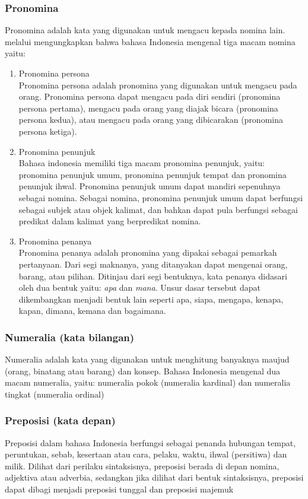 \subsubsection{Pronomina}
Pronomina adalah kata yang digunakan untuk mengacu kepada nomina lain. \citet{alwi} melalui \citet{suryawan} mengungkapkan bahwa bahasa Indonesia mengenal tiga macam nomina yaitu:
\begin{enumerate}
	\item Pronomina persona\\
	Pronomina persona adalah pronomina yang digunakan untuk mengacu pada orang. Pronomina persona dapat mengacu pada diri sendiri (pronomina persona pertama), mengacu pada orang yang diajak bicara (pronomina persona kedua), atau mengacu pada orang yang dibicarakan (pronomina persona ketiga).

	\item Pronomina penunjuk\\
	Bahasa indonesia memiliki tiga macam pronomina penunjuk, yaitu: pronomina penunjuk umum, pronomina penunjuk tempat dan pronomina penunjuk ihwal. Pronomina penunjuk umum dapat mandiri sepenuhnya sebagai nomina. Sebagai nomina, pronomina penunjuk umum dapat berfungsi sebagai subjek atau objek kalimat, dan bahkan dapat pula berfungsi sebagai predikat dalam kalimat yang berpredikat nomina.

	\item Pronomina penanya\\
	Pronomina penanya adalah pronomina yang dipakai sebagai pemarkah pertanyaan. Dari segi maknanya, yang ditanyakan dapat mengenai orang, barang, atau pilihan. Ditinjau dari segi bentuknya, kata penanya didasari oleh dua bentuk yaitu: \emph{apa} dan \emph{mana}. Unsur dasar tersebut dapat dikembangkan menjadi bentuk lain seperti apa, siapa, mengapa, kenapa, kapan, dimana, kemana dan bagaimana.
\end{enumerate}

\subsubsection{Numeralia (kata bilangan)}
Numeralia adalah kata yang digunakan untuk menghitung banyaknya maujud (orang, binatang atau barang) dan konsep. Bahasa Indonesia mengenal dua macam numeralia, yaitu: numeralia pokok (numeralia kardinal) dan numeralia tingkat (numeralia ordinal) \citep{alwi}

\subsubsection{Preposisi (kata depan)}
Preposisi dalam bahasa Indonesia berfungsi sebagai penanda hubungan tempat, peruntukan, sebab, kesertaan atau cara, pelaku, waktu, ihwal (persitiwa) dan milik. Dilihat dari perilaku sintaksisnya, preposisi berada di depan nomina, adjektiva atau adverbia, sedangkan jika dilihat dari bentuk sintaksisnya, preposisi dapat dibagi menjadi preposisi tunggal dan preposisi majemuk \citep{alwi}

